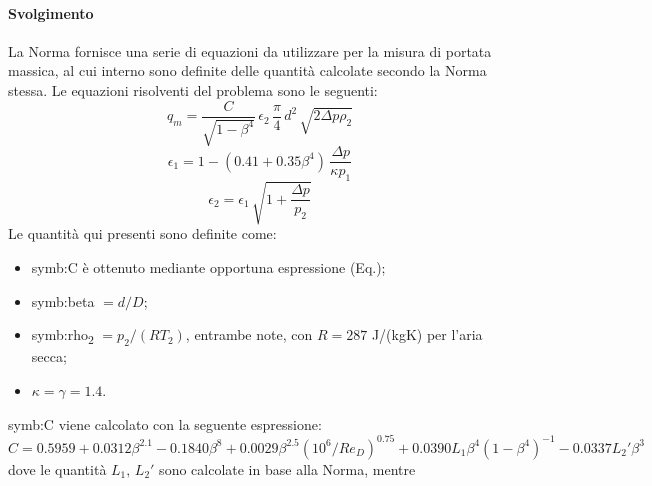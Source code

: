 \paragraph{Svolgimento}
La Norma fornisce una serie di equazioni da utilizzare per la misura di portata massica, al cui interno sono definite delle quantità calcolate secondo la Norma stessa. Le equazioni risolventi del problema sono le seguenti:
\begin{equation}
	q_m=\frac{C}{\sqrt{1-\beta^4}}\, \epsilon_2 \,\frac{\pi}{4} \, d^2 \, \sqrt{2\Delta p \rho_2} \label{eq:portatamassica}
\end{equation}
\begin{equation}
	\epsilon_1= 1 - (0.41+0.35\beta^4) \, \frac{\Delta p}{\kappa p_1} \label{eq:epsilon1}
\end{equation}
\begin{equation}
	\epsilon_2=\epsilon_1 \, \sqrt{1+\frac{\Delta p}{p_2}} \label{eq:epsilon2}
\end{equation}
Le quantità qui presenti sono definite come:
\begin{itemize}
	\item \gls{symb:C} è ottenuto mediante opportuna espressione (Eq.);
	\item \gls{symb:beta} $ = d/D$;
	\item \gls{symb:rho}\textsubscript{2} $= p_2 / (RT_2) $, entrambe note, con $ R = 287 $ J/(kgK) per l'aria secca;
	\item $\kappa = \gamma = 1.4 $.
\end{itemize}
\gls{symb:C} viene calcolato con la seguente espressione:
\begin{equation}
	C=0.5959+0.0312\beta^{2.1}-0.1840\beta^8+0.0029\beta^{2.5} (10^6/Re_D)^{0.75}+0.0390L_1\beta^4(1-\beta^4)^{-1}-0.0337L_2'\beta^3 \label{eq:C}
\end{equation}
dove le quantità $L_1,\,L_2'$ sono calcolate in base alla Norma, mentre 
